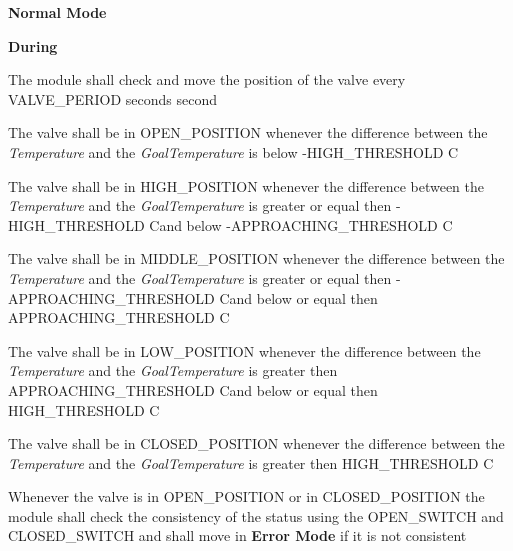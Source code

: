 \begin{req_enum}
\begin{req_enum}[label*=\arabic*.]
					\item \textbf{Normal Mode}
						\begin{req_enum}[label*=\arabic*.]
							\item \textbf{During}
								\begin{req_enum}[label*=\arabic*.]
									\item The module shall check and move the position of the valve every VALVE\_PERIOD seconds  second
									\item The valve shall be in OPEN\_POSITION whenever the difference between the \textit{Temperature} and the \textit{GoalTemperature} is below -HIGH\_THRESHOLD C\degree
									\item The valve shall be in HIGH\_POSITION whenever the difference between the \textit{Temperature} and the \textit{GoalTemperature} is greater or equal then -HIGH\_THRESHOLD C\degree and below -APPROACHING\_THRESHOLD C\degree
									\item The valve shall be in MIDDLE\_POSITION whenever the difference between the \textit{Temperature} and the \textit{GoalTemperature} is greater or equal then -APPROACHING\_THRESHOLD C\degree and below or equal then APPROACHING\_THRESHOLD C\degree
									\item The valve shall be in LOW\_POSITION whenever the difference between the \textit{Temperature} and the \textit{GoalTemperature} is greater then APPROACHING\_THRESHOLD C\degree and below or equal then HIGH\_THRESHOLD C\degree
									\item The valve shall be in CLOSED\_POSITION whenever the difference between the \textit{Temperature} and the \textit{GoalTemperature} is greater then HIGH\_THRESHOLD C\degree
									\item Whenever the valve is in OPEN\_POSITION or in CLOSED\_POSITION the module shall check the consistency of the status using the OPEN\_SWITCH and CLOSED\_SWITCH and shall move in \textbf{Error Mode} if it is not consistent
								\end{req_enum}
						\end{req_enum}


\end{req_enum}
\end{req_enum}
